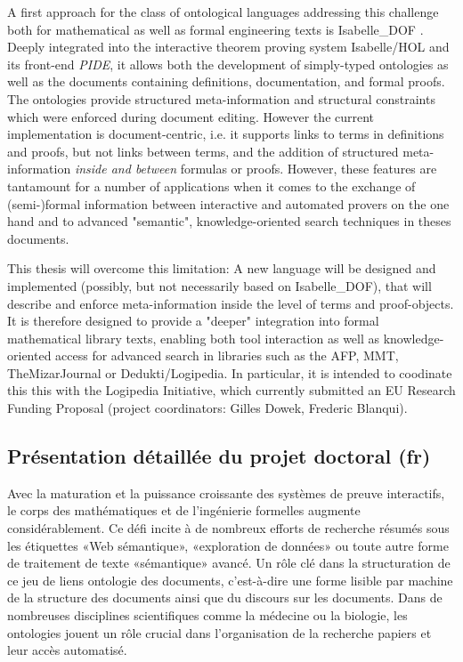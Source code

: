 \documentclass[a4paper,10pt]{article}
\begin{document}
A first approach for the class of ontological languages
addressing this challenge
both for mathematical as well as formal engineering texts is
Isabelle\_DOF
\cite{Brucker-ea.Using-CICM18,BruckerWolff.Design-SEFM19,BruckerWolff.Certif-IFM19}.
Deeply integrated into the interactive theorem proving system Isabelle/HOL
and its front-end \emph{PIDE},
it allows both the development of simply-typed ontologies
as well as the documents containing definitions, documentation,
and formal proofs.
The ontologies provide structured meta-information and structural constraints
which were enforced during document editing.
However the current implementation is document-centric,
i.e. it supports links to terms in definitions and proofs,
but not links between terms, and the addition of structured meta-information
\emph{inside and between} formulas or proofs.
However, these features are tantamount for a number of applications
when it comes to the exchange of (semi-)formal information
between interactive and automated provers on the one hand
and to advanced "semantic", knowledge-oriented search techniques
in theses documents.

This thesis will overcome this limitation:
A new language will be designed and implemented
(possibly, but not necessarily based on Isabelle\_DOF),
that will describe and enforce meta-information
inside the level of terms and proof-objects.
It is therefore designed to provide a "deeper" integration
into formal mathematical library texts,
enabling both tool interaction as well as knowledge-oriented access
for advanced search in libraries such as the AFP, MMT, TheMizarJournal
or Dedukti/Logipedia\cite{afp,mmt,TheMizarJournal,dedukti}.
In particular, it is intended to coodinate this this
with the Logipedia Initiative,
which currently submitted an EU Research Funding Proposal
(project coordinators: Gilles Dowek, Frederic Blanqui).  

\subsection*{Présentation détaillée du projet doctoral (fr)}

Avec la maturation et la puissance croissante
des systèmes de preuve interactifs,
le corps des mathématiques et de l'ingénierie formelles augmente considérablement.
Ce défi incite à de nombreux efforts de recherche
résumés sous les étiquettes «Web sémantique», «exploration de données»
ou toute autre forme de traitement de texte «sémantique» avancé.
Un rôle clé dans la structuration de ce jeu de liens ontologie des documents,
c'est-à-dire une forme lisible par machine de la structure des documents
ainsi que du discours sur les documents.
Dans de nombreuses disciplines scientifiques comme la médecine ou la biologie,
les ontologies jouent un rôle crucial
dans l'organisation de la recherche papiers et leur accès automatisé.
\end{document}

